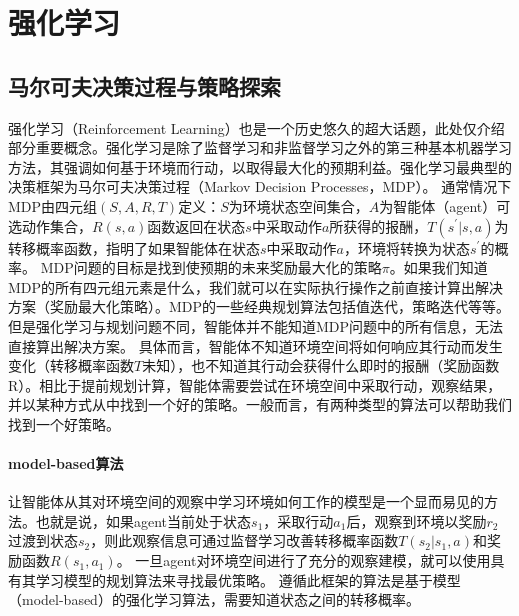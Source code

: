 \section{强化学习}
\subsection{马尔可夫决策过程与策略探索}
强化学习（Reinforcement Learning）也是一个历史悠久的超大话题，此处仅介绍部分重要概念。强化学习是除了监督学习和非监督学习之外的第三种基本机器学习方法，其强调如何基于环境而行动，以取得最大化的预期利益\cite{Sutton1998}。强化学习最典型的决策框架为马尔可夫决策过程（Markov Decision Processes，MDP）\cite{Bel}。
通常情况下MDP由四元组$(S,A,R,T)$定义：$S$为环境状态空间集合，$A$为智能体（agent）可选动作集合，$R(s,a)$函数返回在状态$s$中采取动作$a$所获得的报酬，$T(s^{'}|s,a)$为转移概率函数，指明了如果智能体在状态$s$中采取动作$a$，环境将转换为状态$s^{'}$的概率。
MDP问题的目标是找到使预期的未来奖励最大化的策略$\pi$。如果我们知道MDP的所有四元组元素是什么，我们就可以在实际执行操作之前直接计算出解决方案（奖励最大化策略）。MDP的一些经典规划算法包括值迭代，策略迭代等等\cite{Sutton1998}。但是强化学习与规划问题不同，智能体并不能知道MDP问题中的所有信息，无法直接算出解决方案。
具体而言，智能体不知道环境空间将如何响应其行动而发生变化（转移概率函数$T$未知），也不知道其行动会获得什么即时的报酬（奖励函数R）。相比于提前规划计算，智能体需要尝试在环境空间中采取行动，观察结果，并以某种方式从中找到一个好的策略。一般而言，有两种类型的算法可以帮助我们找到一个好策略\cite{rlbase}。

\paragraph{model-based算法}
让智能体从其对环境空间的观察中学习环境如何工作的模型是一个显而易见的方法。也就是说，如果agent当前处于状态$s_{1}$，采取行动$a_{1}$后，观察到环境以奖励$r_{2}$过渡到状态$s_{2}$，则此观察信息可通过监督学习改善转移概率函数$T(s_{2}|s_{1},a)$和奖励函数$R(s_{1},a_{1})$。
一旦agent对环境空间进行了充分的观察建模，就可以使用具有其学习模型的规划算法来寻找最优策略。 遵循此框架的算法是基于模型（model-based）的强化学习算法，需要知道状态之间的转移概率。
